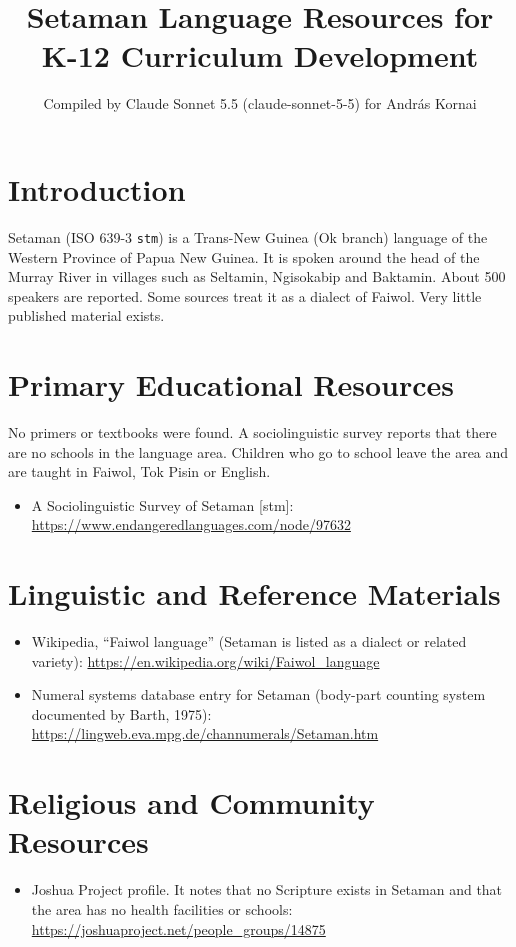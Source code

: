 \documentclass[12pt]{article}
\title{Setaman Language Resources for K-12 Curriculum Development}
\author{Compiled by Claude Sonnet 5.5 (claude-sonnet-5-5) for Andr\'as Kornai}
\date{}
\begin{document}
\maketitle

\section{Introduction}
Setaman (ISO 639-3 \texttt{stm}) is a Trans-New Guinea (Ok branch) language of the Western Province of Papua New Guinea. It is spoken around the head of the Murray River in villages such as Seltamin, Ngisokabip and Baktamin. About 500 speakers are reported. Some sources treat it as a dialect of Faiwol. Very little published material exists.

\section{Primary Educational Resources}
No primers or textbooks were found. A sociolinguistic survey reports that there are no schools in the language area. Children who go to school leave the area and are taught in Faiwol, Tok Pisin or English.
\begin{itemize}
\item A Sociolinguistic Survey of Setaman [stm]: \url{https://www.endangeredlanguages.com/node/97632}
\end{itemize}

\section{Linguistic and Reference Materials}
\begin{itemize}
\item Wikipedia, ``Faiwol language'' (Setaman is listed as a dialect or related variety): \url{https://en.wikipedia.org/wiki/Faiwol_language}
\item Numeral systems database entry for Setaman (body-part counting system documented by Barth, 1975): \url{https://lingweb.eva.mpg.de/channumerals/Setaman.htm}
\end{itemize}

\section{Religious and Community Resources}
\begin{itemize}
\item Joshua Project profile. It notes that no Scripture exists in Setaman and that the area has no health facilities or schools: \url{https://joshuaproject.net/people_groups/14875}
\end{itemize}
\end{document}
